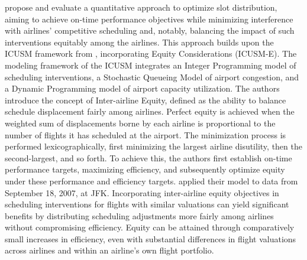  propose and evaluate a quantitative approach to optimize slot distribution, aiming to achieve on-time performance objectives while minimizing interference with airlines’ competitive scheduling and, notably, balancing the impact of such interventions equitably among the airlines. This approach builds upon the \acrfull{ICUSM} framework from , incorporating Equity Considerations (\acrshort{ICUSM-E}). The modeling framework of the \acrshort{ICUSM} integrates an Integer Programming model of scheduling interventions, a Stochastic Queueing Model of airport congestion, and a Dynamic Programming model of airport capacity utilization.
The authors introduce the concept of Inter-airline Equity, defined as the ability to balance schedule displacement fairly among airlines. Perfect equity is achieved when the weighted sum of displacements borne by each airline is proportional to the number of flights it has scheduled at the airport. The minimization process is performed lexicographically, first minimizing the largest airline disutility, then the second-largest, and so forth. To achieve this, the authors first establish on-time performance targets, maximizing efficiency, and subsequently optimize equity under these performance and efficiency targets.  applied their model to data from September 18, 2007, at \acrfull{JFK}. Incorporating inter-airline equity objectives in scheduling interventions for flights with similar valuations can yield significant benefits by distributing scheduling adjustments more fairly among airlines without compromising efficiency. Equity can be attained through comparatively small increases in efficiency, even with substantial differences in flight valuations across airlines and within an airline's own flight portfolio.

